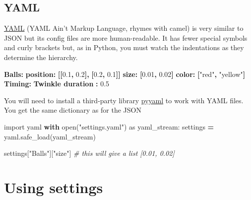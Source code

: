 \documentclass[
]{book}
\newenvironment{Shaded}{\begin{snugshade}}{\end{snugshade}}
\newcommand{\AttributeTok}[1]{\textcolor[rgb]{0.13,0.29,0.53}{#1}}
\newcommand{\BuiltInTok}[1]{#1}
\newcommand{\CommentTok}[1]{\textcolor[rgb]{0.56,0.35,0.01}{\textit{#1}}}
\newcommand{\ControlFlowTok}[1]{\textcolor[rgb]{0.13,0.29,0.53}{\textbf{#1}}}
\newcommand{\FloatTok}[1]{\textcolor[rgb]{0.00,0.00,0.81}{#1}}
\newcommand{\FunctionTok}[1]{\textcolor[rgb]{0.13,0.29,0.53}{\textbf{#1}}}
\newcommand{\ImportTok}[1]{#1}
\newcommand{\KeywordTok}[1]{\textcolor[rgb]{0.13,0.29,0.53}{\textbf{#1}}}
\newcommand{\NormalTok}[1]{#1}
\newcommand{\OperatorTok}[1]{\textcolor[rgb]{0.81,0.36,0.00}{\textbf{#1}}}
\newcommand{\StringTok}[1]{\textcolor[rgb]{0.31,0.60,0.02}{#1}}
\begin{document}
\hypertarget{yaml}{%
\subsection{YAML}\label{yaml}}

\href{https://en.wikipedia.org/wiki/YAML}{YAML} (YAML Ain't Markup Language, rhymes with camel) is very similar to JSON but its config files are more human-readable. It has fewer special symbols and curly brackets but, as in Python, you must watch the indentations as they determine the hierarchy.

\begin{Shaded}
\begin{Highlighting}[]
\FunctionTok{Balls}\KeywordTok{:}
\AttributeTok{  }\FunctionTok{position}\KeywordTok{:}\AttributeTok{ }\KeywordTok{[[}\FloatTok{0.1}\KeywordTok{,}\AttributeTok{ }\FloatTok{0.2}\KeywordTok{],}\AttributeTok{ }\KeywordTok{[}\FloatTok{0.2}\KeywordTok{,}\AttributeTok{ }\FloatTok{0.1}\KeywordTok{]]}
\AttributeTok{  }\FunctionTok{size}\KeywordTok{:}\AttributeTok{ }\KeywordTok{[}\FloatTok{0.01}\KeywordTok{,}\AttributeTok{ }\FloatTok{0.02}\KeywordTok{]}
\AttributeTok{  }\FunctionTok{color}\KeywordTok{:}\AttributeTok{ }\KeywordTok{[}\StringTok{"red"}\KeywordTok{,}\AttributeTok{ }\StringTok{"yellow"}\KeywordTok{]}
\FunctionTok{Timing}\KeywordTok{:}
\AttributeTok{  }\FunctionTok{Twinkle duration }\KeywordTok{:}\AttributeTok{ }\FloatTok{0.5}
\end{Highlighting}
\end{Shaded}

You will need to install a third-party library \href{https://pyyaml.org/}{pyyaml} to work with YAML files. You get the same dictionary as for the JSON

\begin{Shaded}
\begin{Highlighting}[]
\ImportTok{import}\NormalTok{ yaml}
\ControlFlowTok{with} \BuiltInTok{open}\NormalTok{(}\StringTok{"settings.yaml"}\NormalTok{) }\ImportTok{as}\NormalTok{ yaml\_stream:}
\NormalTok{    settings }\OperatorTok{=}\NormalTok{ yaml.safe\_load(yaml\_stream)}
    
\NormalTok{settings[}\StringTok{"Balls"}\NormalTok{][}\StringTok{"size"}\NormalTok{] }\CommentTok{\# this will give a list [0.01, 0.02]}
\end{Highlighting}
\end{Shaded}

\hypertarget{using-settings}{%
\section{Using settings}\label{using-settings}}
\end{document}
